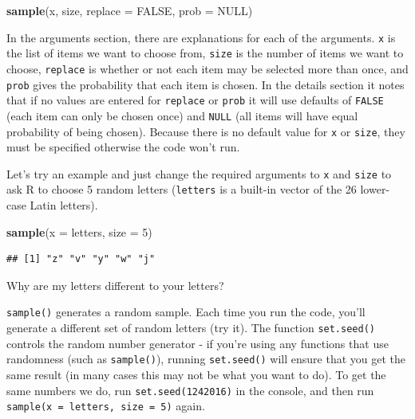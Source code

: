 \documentclass[
  oneside]{book}
\newenvironment{Shaded}{\begin{snugshade}}{\end{snugshade}}
\newcommand{\AttributeTok}[1]{\textcolor[rgb]{0.13,0.29,0.53}{#1}}
\newcommand{\ConstantTok}[1]{\textcolor[rgb]{0.56,0.35,0.01}{#1}}
\newcommand{\DecValTok}[1]{\textcolor[rgb]{0.00,0.00,0.81}{#1}}
\newcommand{\FunctionTok}[1]{\textcolor[rgb]{0.13,0.29,0.53}{\textbf{#1}}}
\newcommand{\NormalTok}[1]{#1}
\begin{document}
\begin{Shaded}
\begin{Highlighting}[]
\FunctionTok{sample}\NormalTok{(x, size, }\AttributeTok{replace =} \ConstantTok{FALSE}\NormalTok{, }\AttributeTok{prob =} \ConstantTok{NULL}\NormalTok{)}
\end{Highlighting}
\end{Shaded}

In the arguments section, there are explanations for each of the arguments. \texttt{x} is the list of items we want to choose from, \texttt{size} is the number of items we want to choose, \texttt{replace} is whether or not each item may be selected more than once, and \texttt{prob} gives the probability that each item is chosen. In the details section it notes that if no values are entered for \texttt{replace} or \texttt{prob} it will use defaults of \texttt{FALSE} (each item can only be chosen once) and \texttt{NULL} (all items will have equal probability of being chosen). Because there is no default value for \texttt{x} or \texttt{size}, they must be specified otherwise the code won't run.

Let's try an example and just change the required arguments to \texttt{x} and \texttt{size} to ask R to choose 5 random letters (\texttt{letters} is a built-in vector{} of the 26 lower-case Latin letters).

\begin{Shaded}
\begin{Highlighting}[]
\FunctionTok{sample}\NormalTok{(}\AttributeTok{x =}\NormalTok{ letters, }\AttributeTok{size =} \DecValTok{5}\NormalTok{)}
\end{Highlighting}
\end{Shaded}

\begin{verbatim}
## [1] "z" "v" "y" "w" "j"
\end{verbatim}

Why are my letters different to your letters?

\texttt{sample()} generates a random sample. Each time you run the code, you'll generate a different set of random letters (try it). The function \texttt{set.seed()} controls the random number generator - if you're using any functions that use randomness (such as \texttt{sample()}), running \texttt{set.seed()} will ensure that you get the same result (in many cases this may not be what you want to do). To get the same numbers we do, run \texttt{set.seed(1242016)} in the console, and then run \texttt{sample(x\ =\ letters,\ size\ =\ 5)} again.
\end{document}
